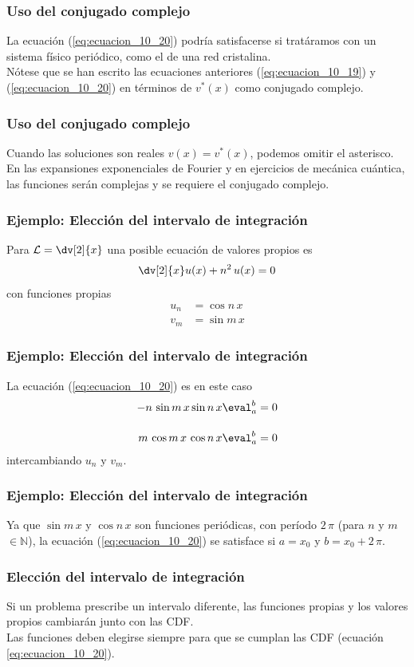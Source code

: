 \begin{frame}
\frametitle{Uso del conjugado complejo}
La ecuación (\ref{eq:ecuacion_10_20}) podría satisfacerse si tratáramos con un sistema físico periódico, como el de una red cristalina.
\\
\bigskip
Nótese que se han escrito las ecuaciones anteriores  (\ref{eq:ecuacion_10_19}) y (\ref{eq:ecuacion_10_20}) en términos de $v^{*}(x)$ como conjugado complejo.
\end{frame}
\begin{frame}
\frametitle{Uso del conjugado complejo}
Cuando las soluciones son reales $v(x) = v^{*}(x)$, podemos omitir el asterisco.
\\
\bigskip
En las expansiones exponenciales de Fourier y en ejercicios de mecánica cuántica, las funciones serán complejas y se requiere el conjugado complejo.
\end{frame}
\begin{frame}
\frametitle{Ejemplo: Elección del intervalo de integración}
Para $\displaystyle \mathcal{L} = \dv[2]{x}$ una posible ecuación de valores propios es
\begin{align}
\dv[2]{x} u(x) + n^{2} \, u(x) = 0
\label{eq:ecuacion_10_21}
\end{align}
con funciones propias
\begin{align*}
u_{n} &= \cos n \, x \\
v_{m} &= \sin m \, x
\end{align*}
\end{frame}
\begin{frame}
\frametitle{Ejemplo: Elección del intervalo de integración}
La ecuación (\ref{eq:ecuacion_10_20}) es en este caso
\begin{align*}
- n \, \sin m \, x \sin n \, x \eval^{b}_{a} &= 0 \\[1em]
m \, \cos m \, x \, \cos n \, x \eval^{b}_{a} &= 0 
\end{align*}
intercambiando $u_{n}$ y $v_{m}$.
\end{frame}
\begin{frame}
\frametitle{Ejemplo: Elección del intervalo de integración}
Ya que $\sin m \, x$ y $\cos n \, x$ son funciones periódicas, con período $2 \, \pi$ (para $n$ y $m$ $\in \mathbb{N}$), la ecuación (\ref{eq:ecuacion_10_20}) se satisface si $a = x_{0}$ y $b = x_{0} + 2 \, \pi$.
\end{frame}
\begin{frame}
\frametitle{Elección del intervalo de integración}
Si un problema prescribe un intervalo diferente, las funciones propias y los valores propios cambiarán junto con las CDF.
\\
\bigskip
\pause
Las funciones deben elegirse siempre para que se cumplan las CDF (ecuación \ref{eq:ecuacion_10_20}).
\end{frame}
